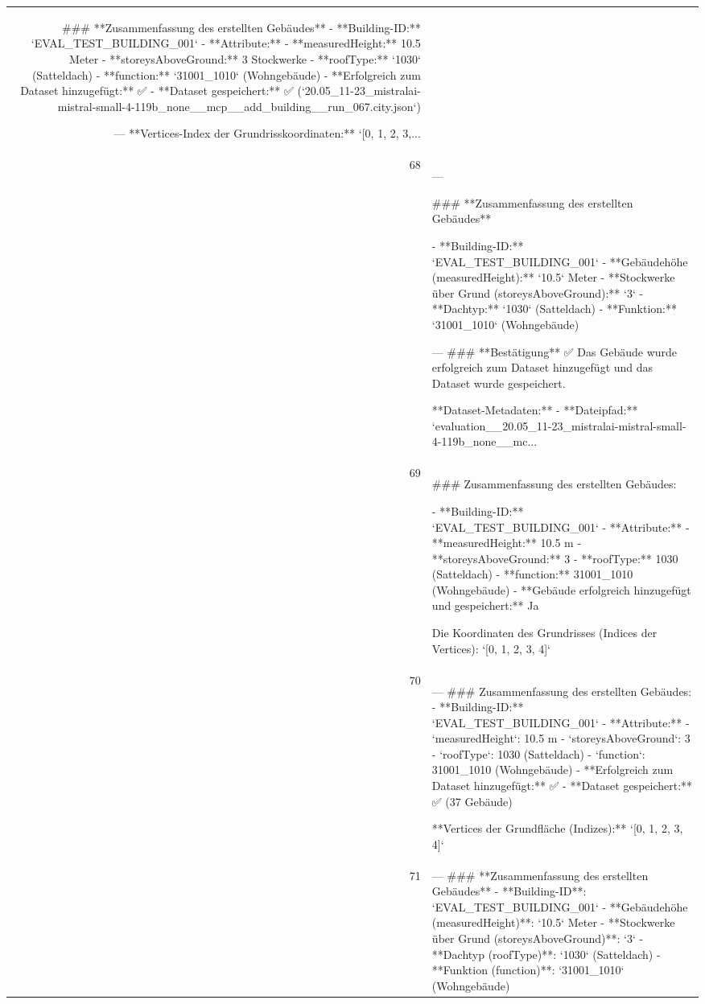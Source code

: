 \documentclass[a4paper,11pt]{article}
\begin{document}
\begin{table}[ht]
\begin{tabular}{r p{12cm}}
\#\#\# **Zusammenfassung des erstellten Gebäudes**
- **Building-ID:** `EVAL\_TEST\_BUILDING\_001`
- **Attribute:**
  - **measuredHeight:** 10.5 Meter
  - **storeysAboveGround:** 3 Stockwerke
  - **roofType:** `1030` (Satteldach)
  - **function:** `31001\_1010` (Wohngebäude)
- **Erfolgreich zum Dataset hinzugefügt:** ✅
- **Dataset gespeichert:** ✅ (`20.05\_11-23\_mistralai-mistral-small-4-119b\_none\_\_mcp\_\_add\_building\_\_run\_067.city.json`)

---
**Vertices-Index der Grundrisskoordinaten:** `[0, 1, 2, 3,... \\
68 & ---

\#\#\# **Zusammenfassung des erstellten Gebäudes**

- **Building-ID:** `EVAL\_TEST\_BUILDING\_001`
- **Gebäudehöhe (measuredHeight):** `10.5` Meter
- **Stockwerke über Grund (storeysAboveGround):** `3`
- **Dachtyp:** `1030` (Satteldach)
- **Funktion:** `31001\_1010` (Wohngebäude)

---
\#\#\# **Bestätigung**
✅ Das Gebäude wurde erfolgreich zum Dataset hinzugefügt und das Dataset wurde gespeichert.

**Dataset-Metadaten:**
- **Dateipfad:** `evaluation\_\_20.05\_11-23\_mistralai-mistral-small-4-119b\_none\_\_mc... \\
69 & \#\#\# Zusammenfassung des erstellten Gebäudes:

- **Building-ID:** `EVAL\_TEST\_BUILDING\_001`
- **Attribute:**
  - **measuredHeight:** 10.5 m
  - **storeysAboveGround:** 3
  - **roofType:** 1030 (Satteldach)
  - **function:** 31001\_1010 (Wohngebäude)
- **Gebäude erfolgreich hinzugefügt und gespeichert:** Ja

Die Koordinaten des Grundrisses (Indices der Vertices):
`[0, 1, 2, 3, 4]` \\
70 & ---
\#\#\# Zusammenfassung des erstellten Gebäudes:
- **Building-ID:** `EVAL\_TEST\_BUILDING\_001`
- **Attribute:**
  - `measuredHeight`: 10.5 m
  - `storeysAboveGround`: 3
  - `roofType`: 1030 (Satteldach)
  - `function`: 31001\_1010 (Wohngebäude)
- **Erfolgreich zum Dataset hinzugefügt:** ✅
- **Dataset gespeichert:** ✅ (37 Gebäude)

**Vertices der Grundfläche (Indizes):**
`[0, 1, 2, 3, 4]` \\
71 & ---
\#\#\# **Zusammenfassung des erstellten Gebäudes**
- **Building-ID**: `EVAL\_TEST\_BUILDING\_001`
- **Gebäudehöhe (measuredHeight)**: `10.5` Meter
- **Stockwerke über Grund (storeysAboveGround)**: `3`
- **Dachtyp (roofType)**: `1030` (Satteldach)
- **Funktion (function)**: `31001\_1010` (Wohngebäude)


\end{tabular}
\end{table}
\end{document}

